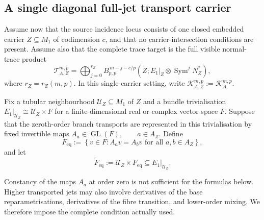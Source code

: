 \documentclass[11pt]{article}
\theoremstyle{plain}
\theoremstyle{definition}
\begin{document}
\subsection{A single diagonal full-jet transport carrier}
\label{subsec:constant-transport}

Assume now that the source incidence locus consists of one closed
embedded carrier \(Z\subseteq M_1\) of codimension \(c\), and that no carrier-intersection conditions are
present. Assume also that the complete trace target is the full
visible normal-trace product
\[
  \mathcal T_{A,Z}^{m,p}
  =
  \bigoplus_{j=0}^{r_Z}
  B_{p,p}^{\,m-j-c/p}
  \left(
    Z;
    E_1|_Z\otimes
    \operatorname{Sym}^jN_Z^*
  \right),
\]
where
\(r_Z=r_Z(m,p)\).
In this single-carrier setting, write
\(\mathcal K_{A,Z}^{m,p} := \mathcal K_A^{m,p}\).

Fix a tubular neighbourhood \(\mathcal U_Z\subseteq M_1\) of \(Z\) and a bundle trivialisation \(E_1|_{\mathcal U_Z} \cong \mathcal U_Z\times F\) for a finite-dimensional real or complex vector space \(F\). Suppose
that the zeroth-order branch transports are represented in this
trivialisation by fixed invertible maps
\(A_a\in\operatorname{GL}(F), \qquad a\in A_Z\).
Define
\[
  F_{\mathrm{eq}}
  :=
  \left\{
    v\in F:
    A_av=A_bv
    \text{ for all }a,b\in A_Z
  \right\},
\]
and let
\[
  \widetilde F_{\mathrm{eq}}
  :=
  \mathcal U_Z\times F_{\mathrm{eq}}
  \subseteq
  E_1|_{\mathcal U_Z}.
\]

Constancy of the maps \(A_a\) at order zero is not sufficient for the
formulas below. Higher transported jets may also involve derivatives
of the base reparametrisations, derivatives of the fibre transition,
and lower-order mixing. We therefore impose the complete condition
actually used.
\end{document}
